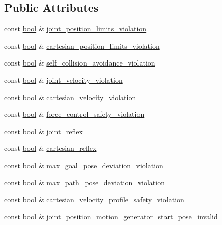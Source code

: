 \subsection*{Public Attributes}
\begin{DoxyCompactItemize}
\item 
const \hyperlink{classbool}{bool} \& \hyperlink{structfranka_1_1Errors_a44ba0d45e52639280d32cf447f967e29}{joint\+\_\+position\+\_\+limits\+\_\+violation}
\item 
const \hyperlink{classbool}{bool} \& \hyperlink{structfranka_1_1Errors_a41c8b50ecbb015a2dba1a3dbbff694b6}{cartesian\+\_\+position\+\_\+limits\+\_\+violation}
\item 
const \hyperlink{classbool}{bool} \& \hyperlink{structfranka_1_1Errors_adf68f6333624cb5558864441a991de8c}{self\+\_\+collision\+\_\+avoidance\+\_\+violation}
\item 
const \hyperlink{classbool}{bool} \& \hyperlink{structfranka_1_1Errors_a803ac4acbc26350602ea2eb02b7b30c4}{joint\+\_\+velocity\+\_\+violation}
\item 
const \hyperlink{classbool}{bool} \& \hyperlink{structfranka_1_1Errors_a382fbec6b463ddcc2cbfd90340021ff1}{cartesian\+\_\+velocity\+\_\+violation}
\item 
const \hyperlink{classbool}{bool} \& \hyperlink{structfranka_1_1Errors_ae7b19674da28b11ba970c30c7d800923}{force\+\_\+control\+\_\+safety\+\_\+violation}
\item 
const \hyperlink{classbool}{bool} \& \hyperlink{structfranka_1_1Errors_afb0928680c586e73d4e2cd4b42c7fe48}{joint\+\_\+reflex}
\item 
const \hyperlink{classbool}{bool} \& \hyperlink{structfranka_1_1Errors_a47bd58b0ab2198e4d038e0a24eafb310}{cartesian\+\_\+reflex}
\item 
const \hyperlink{classbool}{bool} \& \hyperlink{structfranka_1_1Errors_ac55d3624087e606cb4ffab121869d580}{max\+\_\+goal\+\_\+pose\+\_\+deviation\+\_\+violation}
\item 
const \hyperlink{classbool}{bool} \& \hyperlink{structfranka_1_1Errors_ad90cffe703ca1b782007f3ba49da587c}{max\+\_\+path\+\_\+pose\+\_\+deviation\+\_\+violation}
\item 
const \hyperlink{classbool}{bool} \& \hyperlink{structfranka_1_1Errors_afc093fc5f99e1f6cab6de4fa9bc32692}{cartesian\+\_\+velocity\+\_\+profile\+\_\+safety\+\_\+violation}
\item 
const \hyperlink{classbool}{bool} \& \hyperlink{structfranka_1_1Errors_a7af91cbf61dc79304bff3ffadc51ea86}{joint\+\_\+position\+\_\+motion\+\_\+generator\+\_\+start\+\_\+pose\+\_\+invalid}

\end{DoxyCompactItemize}
